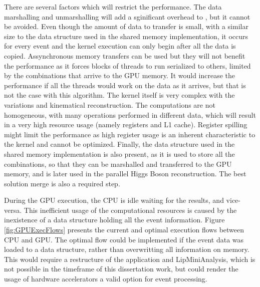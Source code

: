 There are several factors which will restrict the performance. The data marshalling and unmarshalling will add a sginificant overhead to \ttDilepKinFit, but it cannot be avoided. Even though the amount of data to transfer is small, with a similar size to the data structure used in the shared memory implementation, it occurs for every event and the kernel execution can only begin after all the data is copied. Assynchronous memory transfers can be used but they will not benefit the performance as it forces blocks of threads to run serialized to others, limited by the combinations that arrive to the GPU memory. It would increase the performance if all the threads would work on the data as it arrives, but that is not the case with this algorithm. The kernel itself is very complex with the variations and kinematical reconstruction. The computations are not homogeneous, with many operations performed in different data, which will result in a very high resource usage (namely registers and L1 cache). Register spilling might limit the performance as high register usage is an inherent characteristic to the kernel and cannot be optimized. Finally, the data structure used in the shared memory implementation is also present, as it is used to store all the combinations, so that they can be marshalled and transferred to the GPU memory, and is later used in the parallel Higgs Boson reconstruction. The best solution merge is also a required step.

During the GPU execution, the CPU is idle waiting for the results, and vice-versa. This inefficient usage of the computational resources is caused by the inexistence of a data structure holding all the event information. Figure \ref{fig:GPUExecFlows} presents the current and optimal execution flows between CPU and GPU. The optimal flow could be implemented if the event data was loaded to a data structure, rather than overwritting all information on memory. This would require a restructure of the application and LipMiniAnalysis, which is not possible in the timeframe of this dissertation work, but could render the usage of hardware accelerators a valid option for event processing.

